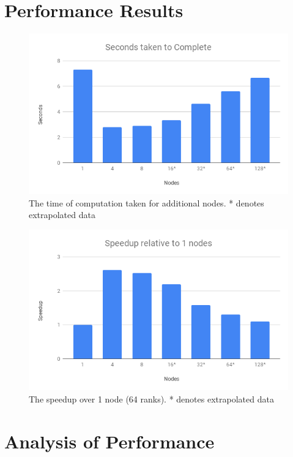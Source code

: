 \documentclass[10pt,a4paper]{article}
\begin{document}
    \section{Performance Results}
    
    \begin{figure}[H]
        \centering
        \includegraphics[scale=0.3]{seconds.png}
        \caption{The time of computation taken for additional nodes. * denotes extrapolated data}
        \label{fig:my_label}
    \end{figure}
    
    \begin{figure}[H]
        \centering
        \includegraphics[scale=0.3]{speedup.png}
        \caption{The speedup over 1 node (64 ranks). * denotes extrapolated data}
        \label{fig:my_label}
    \end{figure}
    
    
    \section{Analysis of Performance}
    
\end{document}
